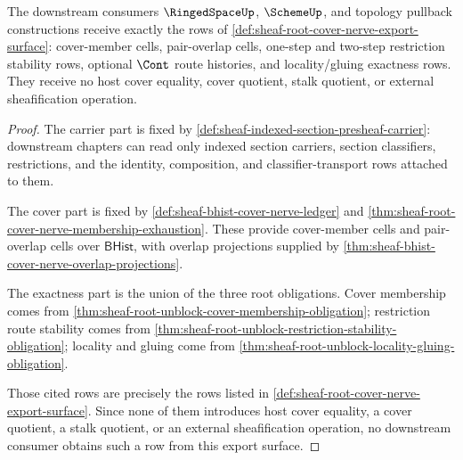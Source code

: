 \begin{theorem}
\label{thm:sheaf-root-cover-nerve-downstream-coverage}
The downstream consumers $\RingedSpaceUp$, $\SchemeUp$, and topology pullback constructions receive exactly the rows of \autoref{def:sheaf-root-cover-nerve-export-surface}: cover-member cells, pair-overlap cells, one-step and two-step restriction stability rows, optional $\Cont$ route histories, and locality/gluing exactness rows. They receive no host cover equality, cover quotient, stalk quotient, or external sheafification operation.
\end{theorem}
\begin{proof}
The carrier part is fixed by \autoref{def:sheaf-indexed-section-presheaf-carrier}: downstream chapters can read only indexed section carriers, section classifiers, restrictions, and the identity, composition, and classifier-transport rows attached to them.

The cover part is fixed by \autoref{def:sheaf-bhist-cover-nerve-ledger} and \autoref{thm:sheaf-root-cover-nerve-membership-exhaustion}. These provide cover-member cells and pair-overlap cells over $\mathsf{BHist}$, with overlap projections supplied by \autoref{thm:sheaf-bhist-cover-nerve-overlap-projections}.

The exactness part is the union of the three root obligations. Cover membership comes from \autoref{thm:sheaf-root-unblock-cover-membership-obligation}; restriction route stability comes from \autoref{thm:sheaf-root-unblock-restriction-stability-obligation}; locality and gluing come from \autoref{thm:sheaf-root-unblock-locality-gluing-obligation}.

Those cited rows are precisely the rows listed in \autoref{def:sheaf-root-cover-nerve-export-surface}. Since none of them introduces host cover equality, a cover quotient, a stalk quotient, or an external sheafification operation, no downstream consumer obtains such a row from this export surface.
\end{proof}

